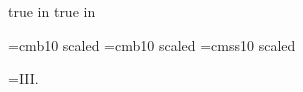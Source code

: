  true in
 true in






\font\boldtitlefont=cmb10 scaled
\font\smallboldtitle=cmb10 scaled 
\font\sans=cmss10 scaled

\footline={\hfil {\tenrm III.\folio}\hfil}

\def\eps{{\varepsilon}}
\def\Eps{{\epsilon}}
\def\kap{{\kappa}}
\def\lam{{\lambda}}

\def\undertext#1{$\underline{\vphantom{y}\hbox{#1}}$}
\def\nspace{\lineskip=1pt\baselineskip=12pt%
     \lineskiplimit=0pt}
\def\dspace{\lineskip=2pt\baselineskip=18pt%
     \lineskiplimit=0pt}

\def\half{{\textstyle 1\over\textstyle 2}}
\def\w{{\mathchoice{\,{\scriptstyle\wedge}\,}
  {{\scriptstyle\wedge}}
  {{\scriptscriptstyle\wedge}}{{\scriptscriptstyle\wedge}}}}
\def\Le{{\mathchoice{\,{\scriptstyle\le}\,}
{\,{\scriptstyle\le}\,}
{\,{\scriptscriptstyle\le}\,}{\,{\scriptscriptstyle\le}\,}}}
\def\Ge{{\mathchoice{\,{\scriptstyle\ge}\,}
{\,{\scriptstyle\ge}\,}
{\,{\scriptscriptstyle\ge}\,}{\,{\scriptscriptstyle\ge}\,}}}
\def\plus{{\hbox{$\scriptscriptstyle +$}}}
\def\Proclaim#1{\medbreak
  \medskip\noindent{\bf#1\enspace}\it\ignorespaces}
\def\finishproclaim{\par\rm
     \ifdim\lastskip<\medskipamount\removelastskip
     \penalty55\medskip\fi}
\def\Item#1{\par\smallskip\hang\indent%
  \llap{\hbox to\parindent {#1\hfill\enspace}}\ignorespaces}

\def\strutdepth{\dp\strutbox}
\def\marginmark{\strut\vadjust{\kern-\strutdepth
     \hskip-25pt\specialmark}}
\def\specialmark{\vtop to \strutdepth{%
     \baselineskip8pt\vss
     \llap{\raise20pt\hbox{\vtop{\hbox{\sevenrm See Prob.}
\hbox{\sevenrm Set \#5.}}}}}\null}

\def\im{{\rm Im}}  \def\Open{{\rm open}}
\def\Diff{{\rm Diff}}  \def\Closed{{\rm closed}}
\def\Map{{\rm Diff}}  \def\spurious{{\rm spurious}}
\def\Met{{\rm Met}} \def\phys{{\rm phys}}
\def\diag{{\rm diag}}  \def\Vir{{\rm Vir}}
\def\spin{{\rm spin}} \def\Res{{\rm Res}}
\def\Null{{\rm null}} \def\mass{{\rm mass}}
\def\SO{{\rm SO}} \def\Tr{{\rm Tr\,}}
\def\SU{{\rm SU}} \def\tr{{\rm tr}}
\def\Weyl{{\rm Weyl}} \def\Ker{{\rm Ker}}
\def\Range{{\rm Range}} \def\SL{{\rm SL}}
\def\Det{{\rm Det}} \def\re{{\rm Re}}
\def\dist{{\rm dist}} \def\psl{{\rm psl}}
\def\Vol{{\rm Vol}} \def\PSL{{\rm PSL}}

